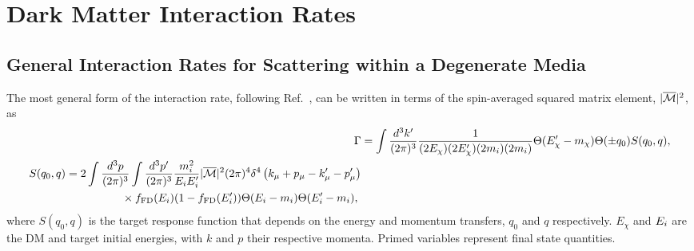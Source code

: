 \chapter{Dark Matter Interaction Rates}
\label{app:interaction_rates}

\section{General Interaction Rates for Scattering within a Degenerate Media}
\label{app:sec:genral_int_rate}

The most general form of the interaction rate, following Ref.~\cite{Bertoni:2013bsa_dec_DarkMatterThermalization}, can be written in terms of the spin-averaged squared matrix element, $|\overline{\mathcal M}|^2$, as
\begin{align}
    \Gamma &= \int\frac{d^3 k'}{(2\pi)^3}\frac{1}{(2E_\chi)(2E_\chi')(2m_i)(2m_i)}\Theta(E_\chi' - m_\chi)\Theta(\pm q_0)S(q_0, q),\\
    \begin{split}
        S(q_0, q) & = 2\int\frac{d^3 p}{(2\pi)^3}\int\frac{d^3 p'}{(2\pi)^3}\frac{m_i^2}{E_i E_i'}|\overline{\mathcal M}|^2(2\pi)^4\delta^4\left( k_\mu + p_\mu - k_\mu' - p_\mu'\right)\\
        &\hspace{5em}\times f_{\rm FD}(E_i)(1 - f_{\rm FD}(E_i'))\Theta(E_i - m_i)\Theta(E_i' - m_i),\label{app:eq:full_response_S}
    \end{split}
\end{align}
where $S(q_0, q)$ is the target response function that depends on the energy and momentum transfers, $q_0$ and $q$ respectively.  $E_\chi$ and $E_i$ are the DM and target initial energies, with $k$ and $p$ their respective momenta. Primed variables represent final state quantities.  


